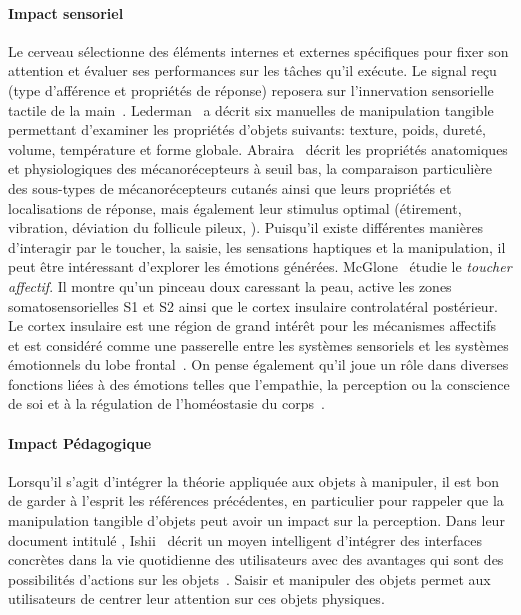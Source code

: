     \paragraph{Impact sensoriel}
        Le cerveau sélectionne des éléments internes et externes spécifiques pour fixer son attention et évaluer ses performances sur les tâches qu'il exécute. Le signal reçu (type d'afférence et propriétés de réponse) reposera sur l'innervation sensorielle tactile de la main~. Lederman~ a décrit six  manuelles de manipulation tangible permettant d’examiner les propriétés d’objets suivants: texture, poids, dureté, volume, température et forme globale. Abraira~ décrit les propriétés anatomiques et physiologiques des mécanorécepteurs à seuil bas, la comparaison particulière des sous-types de mécanorécepteurs cutanés ainsi que leurs propriétés et localisations de réponse, mais également leur stimulus optimal (étirement, vibration, déviation du follicule pileux, \etc). Puisqu'il existe différentes manières d'interagir par le toucher, la saisie, les sensations haptiques et la manipulation, il peut être intéressant d'explorer les émotions générées. McGlone~ étudie le \textit{toucher affectif}. Il montre qu'un pinceau doux caressant la peau, active les zones somatosensorielles S1 et S2 ainsi que le cortex insulaire controlatéral postérieur. Le cortex insulaire est une région de grand intérêt pour les mécanismes affectifs et est considéré comme une passerelle entre les systèmes sensoriels et les systèmes émotionnels du lobe frontal~. On pense également qu'il joue un rôle dans diverses fonctions liées à des émotions telles que l'empathie, la perception ou la conscience de soi et à la régulation de l'homéostasie du corps~.
    \paragraph{Impact Pédagogique}
        Lorsqu'il s'agit d'intégrer la théorie appliquée aux objets à manipuler, il est bon de garder à l'esprit les références précédentes, en particulier pour rappeler que la manipulation tangible d'objets peut avoir un impact sur la perception. Dans leur document intitulé , Ishii~ décrit un moyen intelligent d’intégrer des interfaces concrètes dans la vie quotidienne des utilisateurs avec des avantages qui sont des possibilités d’actions sur les objets~. Saisir et manipuler des objets permet aux utilisateurs de centrer leur attention sur ces objets physiques.
